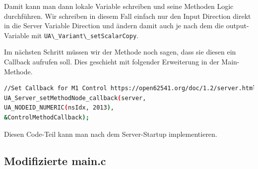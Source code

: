 Damit kann man dann lokale Variable schreiben und seine Methoden Logic durchführen. Wir schreiben in diesem Fall einfach nur den Input Direction direkt in die Server Variable Direction und ändern damit auch je nach dem die output-Variable mit \lstinline|UA\_Variant\_setScalarCopy|.

Im nächsten Schritt müssen wir der Methode noch sagen, dass sie diesen ein Callback aufrufen soll. Dies geschieht mit folgender Erweiterung in der Main-Methode.

\begin{lstlisting}[language=Bash]
//Set Callback for M1 Control https://open62541.org/doc/1.2/server.html#method-callbacks
UA_Server_setMethodNode_callback(server,
UA_NODEID_NUMERIC(nsIdx, 2013),
&ControlMethodCallback);
\end{lstlisting}
Diesen Code-Teil kann man nach dem Server-Startup implementieren.

\subsection{Modifizierte main.c}

